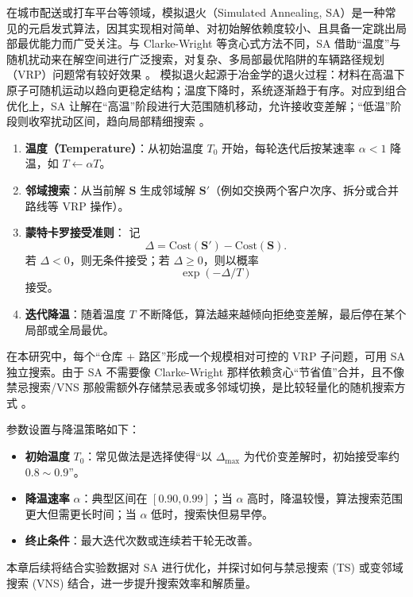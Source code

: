 \documentclass[12pt,a4paper,twoside]{ctexbook}
\begin{document}
在城市配送或打车平台等领域，模拟退火（Simulated Annealing, SA）是一种常见的元启发式算法，因其实现相对简单、对初始解依赖度较小、且具备一定跳出局部最优能力而广受关注。与 Clarke-Wright 等贪心式方法不同，SA 借助“温度”与随机扰动来在解空间进行广泛搜索，对复杂、多局部最优陷阱的车辆路径规划（VRP）问题常有较好效果 \cite{vidal2013hybrid}。
模拟退火起源于冶金学的退火过程：材料在高温下原子可随机运动以趋向更稳定结构；温度下降时，系统逐渐趋于有序。对应到组合优化上，SA 让解在“高温”阶段进行大范围随机移动，允许接收变差解；“低温”阶段则收窄扰动区间，趋向局部精细搜索 \cite{golden2008vehicle}。

\begin{enumerate}
    \item \textbf{温度（Temperature）}：从初始温度 $T_0$ 开始，每轮迭代后按某速率 $\alpha < 1$ 降温，如 $T \leftarrow \alpha T$。
    \item \textbf{邻域搜索}：从当前解 $\mathbf{S}$ 生成邻域解 $\mathbf{S}'$（例如交换两个客户次序、拆分或合并路线等 VRP 操作）。
    \item \textbf{蒙特卡罗接受准则}：
    记
    \[
    \Delta = \text{Cost}(\mathbf{S}') - \text{Cost}(\mathbf{S}).
    \]
    若 $\Delta < 0$，则无条件接受；若 $\Delta \geq 0$，则以概率
    \[
    \exp(-\Delta / T)
    \]
    接受。
    \item \textbf{迭代降温}：随着温度 $T$ 不断降低，算法越来越倾向拒绝变差解，最后停在某个局部或全局最优。
\end{enumerate}

在本研究中，每个“仓库 + 路区”形成一个规模相对可控的 VRP 子问题，可用 SA 独立搜索。由于 SA 不需要像 Clarke-Wright 那样依赖贪心“节省值”合并，且不像禁忌搜索/VNS 那般需额外存储禁忌表或多邻域切换，是比较轻量化的随机搜索方式 \cite{vidal2013hybrid}。

参数设置与降温策略如下：
\begin{itemize}
    \item \textbf{初始温度} $T_0$：常见做法是选择使得“以 $\Delta_{\max}$ 为代价变差解时，初始接受率约 $0.8 \sim 0.9$”。
    \item \textbf{降温速率} $\alpha$：典型区间在 $[0.90, 0.99]$；当 $\alpha$ 高时，降温较慢，算法搜索范围更大但需更长时间；当 $\alpha$ 低时，搜索快但易早停。
    \item \textbf{终止条件}：最大迭代次数或连续若干轮无改善。
\end{itemize}

本章后续将结合实验数据对 SA 进行优化，并探讨如何与禁忌搜索 (TS) 或变邻域搜索 (VNS) 结合，进一步提升搜索效率和解质量。
\end{document}
